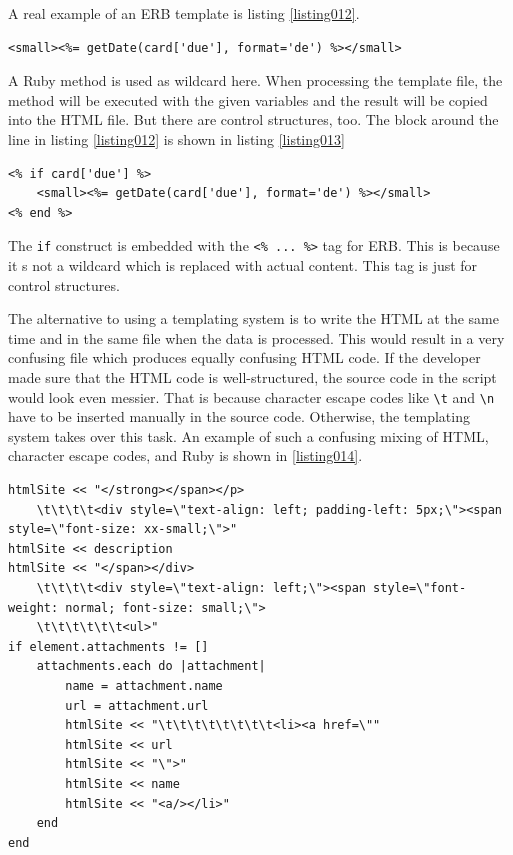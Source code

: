 A real example of an ERB template is listing \ref{listing012}.

\begin{lstlisting}[aboveskip=1\baselineskip, caption=Ruby method in ERB template., label=listing012]
<small><%= getDate(card['due'], format='de') %></small>
\end{lstlisting}

A Ruby method is used as wildcard here. When processing the template file, the method will be executed with the given variables and the result will be copied into the HTML file. But there are control structures, too. The block around the line in listing \ref{listing012} is shown in listing \ref{listing013}

\begin{lstlisting}[aboveskip=1\baselineskip, caption=Ruby method in ERB template., label=listing013]
<% if card['due'] %>
	<small><%= getDate(card['due'], format='de') %></small>
<% end %>
\end{lstlisting}

The \lstinline{if} construct is embedded with the \lstinline{<% ... %>} tag for ERB. This is because it s not a wildcard which is replaced with actual content. This tag is just for control structures.

The alternative to using a templating system is to write the HTML at the same time and in the same file when the data is processed. This would result in a very confusing file which produces equally confusing HTML code. If the developer made sure that the HTML code is well-structured, the source code in the script would look even messier. That is because character escape codes like \lstinline{\t} and \lstinline{\n} have to be inserted manually in the source code. Otherwise, the templating system takes over this task. An example of such a confusing mixing of HTML, character escape codes, and Ruby is shown in \ref{listing014}.

\begin{lstlisting}[aboveskip=1\baselineskip, caption=Generating HTML without a templating engine., label=listing014]
htmlSite << "</strong></span></p>
	\t\t\t\t<div style=\"text-align: left; padding-left: 5px;\"><span style=\"font-size: xx-small;\">"
htmlSite << description		
htmlSite << "</span></div>
	\t\t\t\t<div style=\"text-align: left;\"><span style=\"font-weight: normal; font-size: small;\"> 
	\t\t\t\t\t\t<ul>"
if element.attachments != []
	attachments.each do |attachment|
		name = attachment.name
		url = attachment.url
		htmlSite << "\t\t\t\t\t\t\t\t<li><a href=\""
		htmlSite << url
		htmlSite << "\">"
		htmlSite << name
		htmlSite << "<a/></li>"
	end	
end	
\end{lstlisting}

